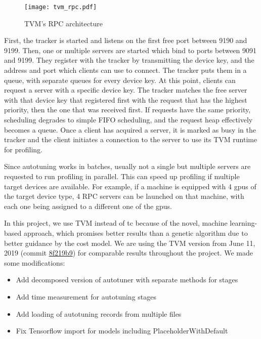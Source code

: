 \begin{figure}
	\centering
	\texttt{[image: tvm\_rpc.pdf]}%
	\caption{TVM's RPC architecture}
	\label{fig:tvm-rpc}
\end{figure}

First, the tracker is started and listens on the first free port between 9190 and 9199. Then, one or multiple servers are started which bind to ports between 9091 and 9199. They register with the tracker by transmitting the device key, and the address and port which clients can use to connect. The tracker puts them in a queue, with separate queues for every device key. At this point, clients can request a server with a specific device key. The tracker matches the free server with that device key that registered first with the request that has the highest priority, then the one that was received first. If requests have the same priority, scheduling degrades to simple FIFO scheduling, and the request heap effectively becomes a queue. Once a client has acquired a server, it is marked as busy in the tracker and the client initiates a connection to the server to use its TVM runtime for profiling.

Since autotuning works in batches, usually not a single but multiple servers are requested to run profiling in parallel. This can speed up profiling if multiple target devices are available. For example, if a machine is equipped with 4 \glspl{gpu} of the target device type, 4 RPC servers can be launched on that machine, with each one being assigned to a different one of the \glspl{gpu}.

In this project, we use TVM instead of \gls{tc} because of the novel, machine learning-based approach, which promises better results than a genetic algorithm due to better guidance by the cost model. We are using the TVM version from June 11, 2019 (commit \href{https://github.com/dmlc/tvm/tree/8f219b9}{8f219b9}) for comparable results throughout the project. We made some modifications:
\begin{itemize}
	\item Add decomposed version of autotuner with separate methods for stages
	\item Add time measurement for autotuning stages
	\item Add loading of autotuning records from multiple files
	\item Fix Tensorflow import for models including PlaceholderWithDefault
\end{itemize}
